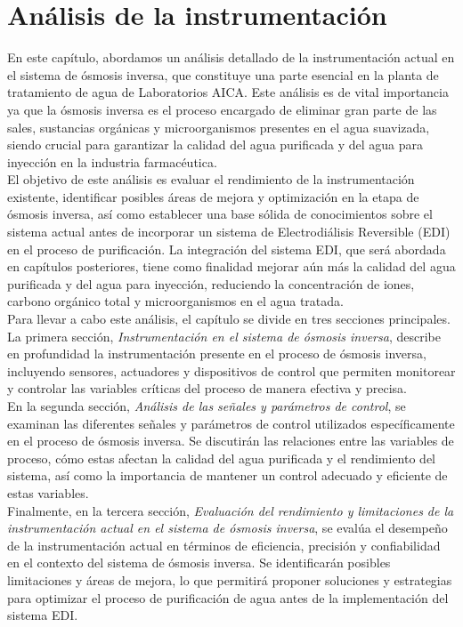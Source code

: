 \chapter{Análisis de la instrumentación}

En este capítulo, abordamos un análisis detallado de la instrumentación actual en el sistema de ósmosis inversa, que constituye una parte esencial en la planta de tratamiento de agua de Laboratorios AICA. Este análisis es de vital importancia ya que la ósmosis inversa es el proceso encargado de eliminar gran parte de las sales, sustancias orgánicas y microorganismos presentes en el agua suavizada, siendo crucial para garantizar la calidad del agua purificada y del agua para inyección en la industria farmacéutica.\\

El objetivo de este análisis es evaluar el rendimiento de la instrumentación existente, identificar posibles áreas de mejora y optimización en la etapa de ósmosis inversa, así como establecer una base sólida de conocimientos sobre el sistema actual antes de incorporar un sistema de Electrodiálisis Reversible (EDI) en el proceso de purificación. La integración del sistema EDI, que será abordada en capítulos posteriores, tiene como finalidad mejorar aún más la calidad del agua purificada y del agua para inyección, reduciendo la concentración de iones, carbono orgánico total y microorganismos en el agua tratada.\\

Para llevar a cabo este análisis, el capítulo se divide en tres secciones principales. La primera sección, \textit{Instrumentación en el sistema de ósmosis inversa}, describe en profundidad la instrumentación presente en el proceso de ósmosis inversa, incluyendo sensores, actuadores y dispositivos de control que permiten monitorear y controlar las variables críticas del proceso de manera efectiva y precisa.\\

En la segunda sección, \textit{Análisis de las señales y parámetros de control}, se examinan las diferentes señales y parámetros de control utilizados específicamente en el proceso de ósmosis inversa. Se discutirán las relaciones entre las variables de proceso, cómo estas afectan la calidad del agua purificada y el rendimiento del sistema, así como la importancia de mantener un control adecuado y eficiente de estas variables.\\

Finalmente, en la tercera sección, \textit{Evaluación del rendimiento y limitaciones de la instrumentación actual en el sistema de ósmosis inversa}, se evalúa el desempeño de la instrumentación actual en términos de eficiencia, precisión y confiabilidad en el contexto del sistema de ósmosis inversa. Se identificarán posibles limitaciones y áreas de mejora, lo que permitirá proponer soluciones y estrategias para optimizar el proceso de purificación de agua antes de la implementación del sistema EDI.\\ 


